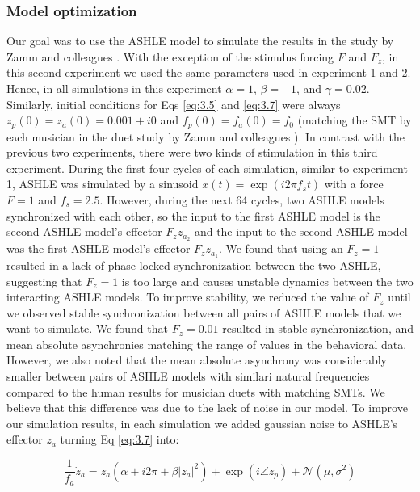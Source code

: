 \documentclass{report}
\begin{document}
\subsubsection{Model optimization}

Our goal was to use the ASHLE model to simulate the results in the study by Zamm and colleagues \cite{zamm2016endogenous}. With the exception of the stimulus forcing $F$ and $F_z$, in this second experiment we used the same parameters used in experiment 1 and 2. Hence, in all simulations in this experiment $\alpha = 1$, $\beta = −1$, and $\gamma = 0.02$. Similarly, initial conditions for Eqs \eqref{eq:3.5} and \eqref{eq:3.7} were always $z_p(0)=z_a(0)=0.001 + i0$ and $f_p(0)=f_a(0)=f_0$ (matching the SMT by each musician in the duet study by Zamm and colleagues \cite{zamm2016endogenous}). In contrast with the previous two experiments, there were two kinds of stimulation in this third experiment. During the first four cycles of each simulation, similar to experiment 1, ASHLE was simulated by a sinusoid $x(t)=\exp(i2\pi f_s t)$ with a force $F = 1$ and $f_s=2.5$. However, during the next 64 cycles, two ASHLE models synchronized with each other, so the input to the first ASHLE model is the second ASHLE model's effector $F_z z_{a_2}$ and the input to the second ASHLE model was the first ASHLE model's effector $F_z z_{a_1}$. We found that using an $F_z = 1$ resulted in a lack of phase-locked synchronization between the two ASHLE, suggesting that $F_z = 1$ is too large and causes unstable dynamics between the two interacting ASHLE models. To improve stability, we reduced the value of $F_z$ until we observed stable synchronization between all pairs of ASHLE models that we want to simulate. We found that $F_z = 0.01$ resulted in stable synchronization, and mean absolute asynchronies matching the range of values in the behavioral data. However, we also noted that the mean absolute asynchrony was considerably smaller between pairs of ASHLE models with similari natural frequencies compared to the human results for musician duets with matching SMTs. We believe that this difference was due to the lack of noise in our model. To improve our simulation results, in each simulation we added gaussian noise to ASHLE's effector $z_a$ turning Eq \eqref{eq:3.7} into:

\begin{equation}
\frac{1}{f_a}\dot{z}_a = z_a \left( \alpha + i2\pi + \beta|z_a|^2 \right) + \exp(i \angle z_p) + \mathcal{N}(\mu, \sigma^2) \label{eq:3.9}
\end{equation}
\end{document}
